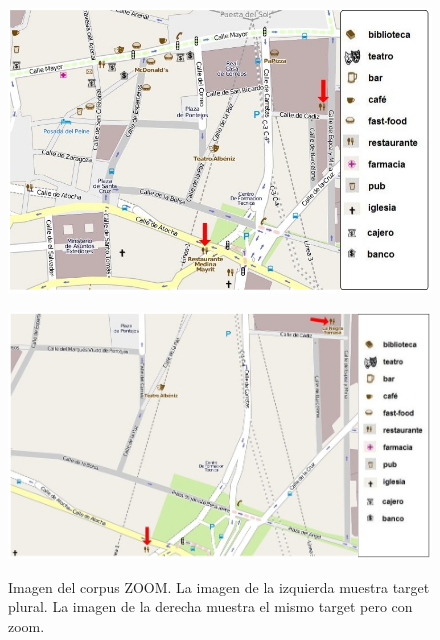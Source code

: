 \begin{figure}
\begin{minipage}[b]{0.48\linewidth}
\centering
\includegraphics[width=\textwidth]{images/corpus/mapa9.png}
\caption{}
\label{mapa19}
\end{minipage}
\hspace*{0cm}
\begin{minipage}[b]{0.55\linewidth}
\centering
\includegraphics[width=\textwidth]{images/corpus/mapa19.png}\\[0pt]
\caption{}
\label{mapa20}
\end{minipage}
\caption{Imagen del corpus ZOOM. La imagen de la izquierda muestra target plural. La imagen de la derecha muestra el mismo target pero con zoom.}

\end{figure}

